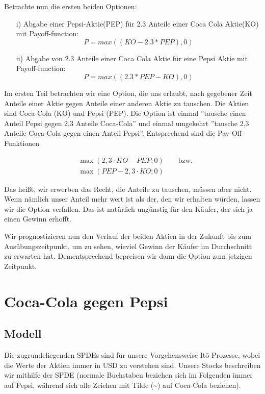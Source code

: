 \documentclass[12pt]{article}
\begin{document}
Betrachte nun die ersten beiden Optionen:
\begin{itemize}
	\item[i)] Abgabe einer Pepsi-Aktie(PEP) für 2.3 Anteile einer Coca Cola Aktie(KO) mit Payoff-function:
	\begin{equation*}
	P=max((KO-2.3*PEP),0)
	\end{equation*}			
	\item[ii)] Abgabe von 2.3 Anteile einer Coca Cola Aktie für eine Pepsi Aktie mit Payoff-function:
	\begin{equation*}
	P=max((2.3*PEP-KO),0)
	\end{equation*}			
\end{itemize}


Im ersten Teil betrachten wir eine Option, die uns erlaubt, nach gegebener Zeit Anteile einer Aktie gegen Anteile einer anderen Aktie zu tauschen. Die Aktien sind Coca-Cola (KO) und Pepsi (PEP). Die Option ist einmal ''tausche einen Anteil Pepsi gegen 2,3 Anteile Coca-Cola'' und einmal umgekehrt ''tausche 2,3 Anteile Coca-Cola gegen einen Anteil Pepsi''. Entsprechend sind die Pay-Off-Funktionen

\begin{align*}
&\max(2,3\cdot KO - PEP; 0) \qquad \text{bzw.} \\
&\max(PEP - 2,3\cdot KO; 0)
\end{align*}

Das heißt, wir erwerben das Recht, die Anteile zu tauschen, müssen aber nicht. Wenn nämlich unser Anteil mehr wert ist als der, den wir erhalten würden, lassen wir die Option verfallen. Das ist natürlich ungünstig für den Käufer, der sich ja einen Gewinn erhofft.

Wir prognostizieren nun den Verlauf der beiden Aktien in der Zukunft bis zum Ausübungszeitpunkt, um zu sehen, wieviel Gewinn der Käufer im Durchschnitt zu erwarten hat. Dementsprechend bepreisen wir dann die Option zum jetzigen Zeitpunkt.


\section{Coca-Cola gegen Pepsi}

\subsection{Modell}

Die zugrundeliegenden SPDEs sind für unsere Vorgehensweise It\={o}-Prozesse, wobei die Werte der Aktien immer in USD zu verstehen sind. Unsere Stocks beschreiben wir mithilfe der SPDE (normale Buchstaben beziehen sich im Folgenden immer auf Pepsi, während sich alle Zeichen mit Tilde (\~{}) auf Coca-Cola beziehen).
\end{document}
